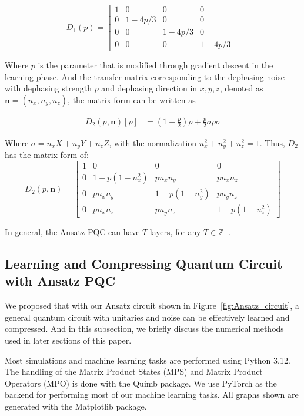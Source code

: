 \documentclass[%
 reprint,
superscriptaddress,
 amsmath,amssymb,
 aps,
]{revtex4-2}
\begin{document}
\begin{equation}
    D_1(p) = \begin{bmatrix}
        1 &0 & 0 & 0 \\
        0 & 1-4p/3 & 0 & 0\\
        0  & 0 & 1-4p/3 & 0 \\
        0  & 0 & 0 & 1-4p/3
    \end{bmatrix}
    \label{eq:Depolarizing_D_1}
\end{equation}

Where $p$ is the parameter that is modified through gradient descent in the learning phase. And the transfer matrix corresponding to the dephasing noise with dephasing strength $p$ and dephasing direction in $x, y, z$, denoted as $\mathbf{n}=(n_x, n_y, n_z)$, the matrix form can be written as

\begin{equation}
\begin{split}
    D_2(p, \mathbf{n})[\rho] &= \left(1-\frac{p}{2}\right)\rho + \frac{p}{2}\sigma \rho\sigma
\end{split}
\end{equation}

Where $\sigma = n_xX+n_yY+n_zZ$, with the normalization $n_x^2+n_y^2+n_z^2 = 1$. Thus, $D_2$ has the matrix form of:
\begin{equation}
D_2(p, \mathbf{n}) = \begin{bmatrix}
1 & 0 & 0 & 0 \\
0 & 1 - p(1 - n_x^2) & p n_x n_y & p n_x n_z \\
0 & p n_x n_y & 1 - p(1 - n_y^2) & p n_y n_z \\
0 & p n_x n_z & p n_y n_z & 1 - p(1 - n_z^2)
\end{bmatrix}
\end{equation}

In general, the Ansatz PQC can have $T$ layers, for any $T\in \mathbb{Z}^+$.

\subsection{Learning and Compressing Quantum Circuit with Ansatz PQC}
We proposed that with our Ansatz circuit shown in Figure~\ref{fig:Ansatz_circuit}, a general quantum circuit with unitaries and noise can be effectively learned and compressed. And in this subsection, we briefly discuss the numerical methods used in later sections of this paper.

Most simulations and machine learning tasks are performed using Python 3.12. The handling of the Matrix Product States (MPS) and Matrix Product Operators (MPO) is done with the Quimb package. We use PyTorch as the backend for performing most of our machine learning tasks. All graphs shown are generated with the Matplotlib package. 
\end{document}
